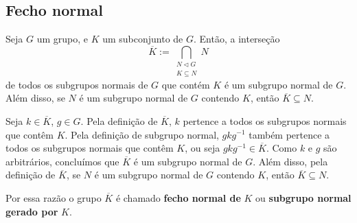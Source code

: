 \subsection{Fecho normal} %
\label{fecho-normal-def}

\begin{prop}
    Seja $G$ um grupo, e $K$ um subconjunto de $G$. Então, a interseção 
    \[\overline{K}:=\bigcap_{\substack{N\triangleleft G\\K\subseteq N}}N\]
    de todos os subgrupos normais de $G$ que contém $K$ é um subgrupo normal de $G$. Além disso, se $N$ é um subgrupo normal de $G$ contendo $K$, então $\overline{K}\subseteq N$.
\end{prop}

\begin{dem}
    Seja $k\in \overline{K}$, $g\in G$. Pela definição de $\overline{K}$, $k$ pertence a todos os subgrupos normais que contêm $K$. Pela definição de subgrupo normal, $gkg^{-1}$ também pertence a todos os subgrupos normais que contêm $K$, ou seja $gkg^{-1}\in \overline{K}$. Como $k$ e $g$ são arbitrários, concluímos que $\overline{K}$ é um subgrupo normal de $G$. Além disso, pela definição de $\overline{K}$, se $N$ é um subgrupo normal de $G$ contendo $K$, então $\overline{K}\subseteq N$.
\end{dem}

Por essa razão o grupo $\overline{K}$ é chamado \textbf{fecho normal de} $K$ ou \textbf{subgrupo normal gerado por} $K$.